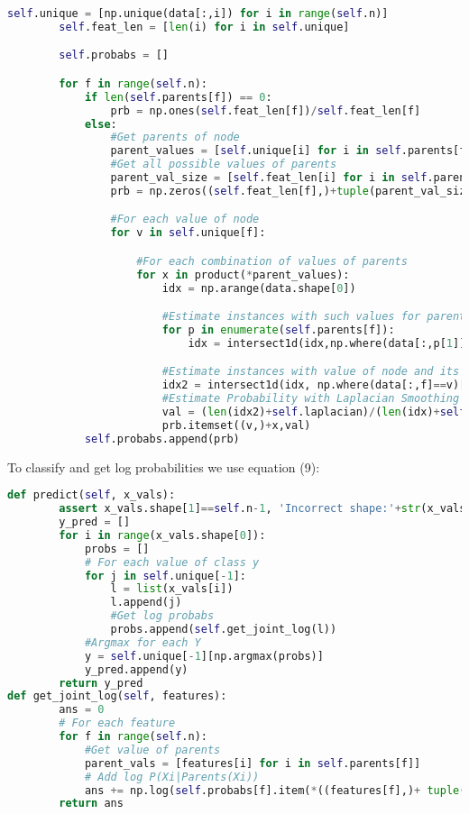 \documentclass[addpoints,11pt,a4paper]{exam}
\begin{document}
\begin{questions}
\begin{parts}
\begin{solution}
\begin{lstlisting}[language=Python, style=mystyle]
        self.unique = [np.unique(data[:,i]) for i in range(self.n)]
        self.feat_len = [len(i) for i in self.unique]

        self.probabs = []

        for f in range(self.n):
            if len(self.parents[f]) == 0:
                prb = np.ones(self.feat_len[f])/self.feat_len[f]
            else:
                #Get parents of node
                parent_values = [self.unique[i] for i in self.parents[f]]
                #Get all possible values of parents
                parent_val_size = [self.feat_len[i] for i in self.parents[f]]
                prb = np.zeros((self.feat_len[f],)+tuple(parent_val_size))

                #For each value of node
                for v in self.unique[f]:

                    #For each combination of values of parents
                    for x in product(*parent_values):
                        idx = np.arange(data.shape[0])

                        #Estimate instances with such values for parents
                        for p in enumerate(self.parents[f]):
                            idx = intersect1d(idx,np.where(data[:,p[1]]==x[p[0]])[0])

                        #Estimate instances with value of node and its parents
                        idx2 = intersect1d(idx, np.where(data[:,f]==v)[0])
                        #Estimate Probability with Laplacian Smoothing
                        val = (len(idx2)+self.laplacian)/(len(idx)+self.laplacian*self.feat_len[f])
                        prb.itemset((v,)+x,val)
            self.probabs.append(prb)
 \end{lstlisting}
 
 To classify and get log probabilities we use equation (9):
 \begin{lstlisting}[language=Python, style=mystyle]
 def predict(self, x_vals):
        assert x_vals.shape[1]==self.n-1, 'Incorrect shape:'+str(x_vals.shape)
        y_pred = []
        for i in range(x_vals.shape[0]):
            probs = []
            # For each value of class y
            for j in self.unique[-1]:
                l = list(x_vals[i])
                l.append(j)
                #Get log probabs
                probs.append(self.get_joint_log(l))
            #Argmax for each Y
            y = self.unique[-1][np.argmax(probs)]
            y_pred.append(y)
        return y_pred
def get_joint_log(self, features):
        ans = 0
        # For each feature
        for f in range(self.n):
            #Get value of parents
            parent_vals = [features[i] for i in self.parents[f]]
            # Add log P(Xi|Parents(Xi))
            ans += np.log(self.probabs[f].item(*((features[f],)+ tuple(parent_vals))))
        return ans
 \end{lstlisting}
 

\end{solution}
\end{parts}
\end{questions}
\end{document}
